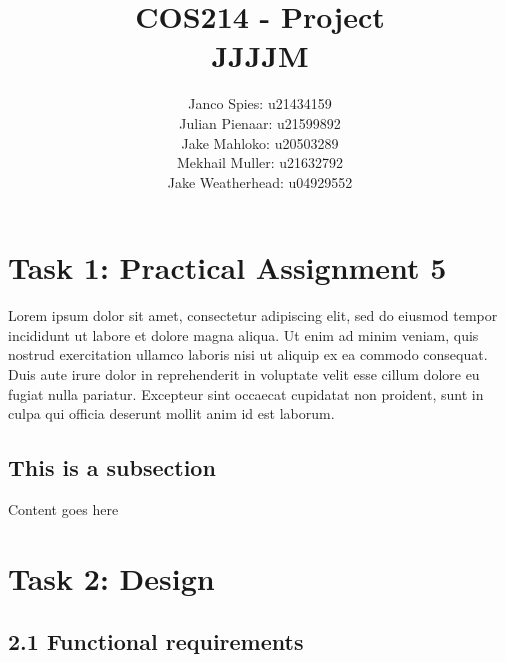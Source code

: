 \documentclass[titlepage]{article}
\title{ \Huge{\fontsize{30}{11}\selectfont COS214 - Project} \\  \LARGE{\fontsize{22}{13}\selectfont JJJJM}}
\author{%
	\fontsize{19}{13} \selectfont 
	Janco Spies: u21434159 \vspace{0.25em} \\
	\fontsize{19}{13} \selectfont 
	Julian Pienaar: u21599892 \vspace{0.25em} \\
	\fontsize{19}{13} \selectfont
	Jake Mahloko: u20503289 \vspace{0.25em} \\
	\fontsize{19}{13} \selectfont
	Mekhail Muller: u21632792 \vspace{0.25em} \\
	\fontsize{19}{13} \selectfont
	Jake Weatherhead: u04929552 \vspace{0.25em}
}
\date{}
\begin{document}
\maketitle
\pagebreak


\tableofcontents
\newpage


\section*{Task 1: Practical Assignment 5}
Lorem ipsum dolor sit amet, consectetur adipiscing elit, sed do eiusmod tempor incididunt ut labore et dolore magna aliqua. Ut enim ad minim veniam, quis nostrud exercitation ullamco laboris nisi ut aliquip ex ea commodo consequat. Duis aute irure dolor in reprehenderit in voluptate velit esse cillum dolore eu fugiat nulla pariatur. Excepteur sint occaecat cupidatat non proident, sunt in culpa qui officia deserunt mollit anim id est laborum.

\subsection*{This is a subsection}
Content goes here


\section*{Task 2: Design}
\subsection*{2.1 Functional requirements}
\end{document}
